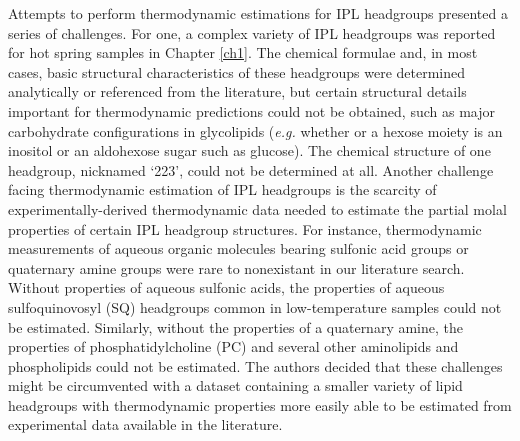 Attempts to perform thermodynamic estimations for IPL headgroups presented a series of challenges. For one, a complex variety of IPL headgroups was reported for hot spring samples in Chapter \ref{ch1}. The chemical formulae and, in most cases, basic structural characteristics of these headgroups were determined analytically or referenced from the literature, but certain structural details important for thermodynamic predictions could not be obtained, such as major carbohydrate configurations in glycolipids (\textit{e.g.} whether or a hexose moiety is an inositol or an aldohexose sugar such as glucose). The chemical structure of one headgroup, nicknamed `223', could not be determined at all. Another challenge facing thermodynamic estimation of IPL headgroups is the scarcity of experimentally-derived thermodynamic data needed to estimate the partial molal properties of certain IPL headgroup structures. For instance, thermodynamic measurements of aqueous organic molecules bearing sulfonic acid groups or quaternary amine groups were rare to nonexistant in our literature search. Without properties of aqueous sulfonic acids, the properties of aqueous sulfoquinovosyl (SQ) headgroups common in low-temperature samples could not be estimated. Similarly, without the properties of a quaternary amine, the properties of phosphatidylcholine (PC) and several other aminolipids and phospholipids could not be estimated. The authors decided that these challenges might be circumvented with a dataset containing a smaller variety of lipid headgroups with thermodynamic properties more easily able to be estimated from experimental data available in the literature.


